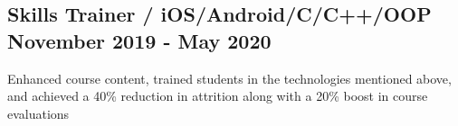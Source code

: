 \subsection{{Skills Trainer / iOS/Android/C/C++/OOP \hfill November 2019 - May 2020}}
\begin{zitemize}

\item Enhanced course content, trained students in the technologies mentioned above, and achieved a 40\% reduction in attrition along with a 20\% boost in course evaluations
    
\end{zitemize}